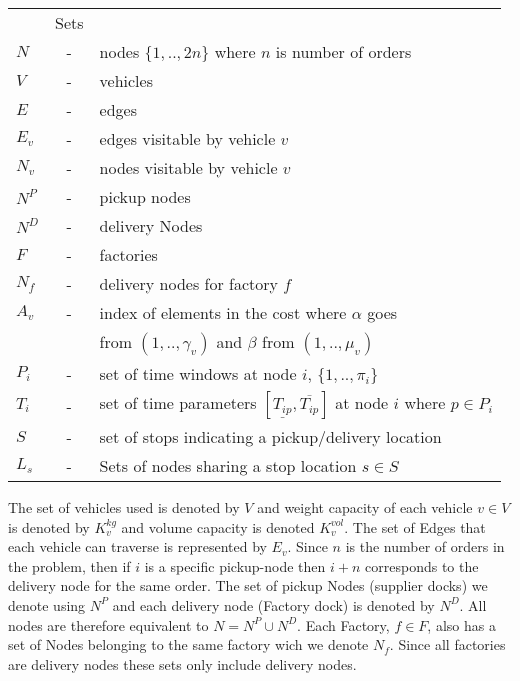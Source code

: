 \documentclass[a4paper,10pt]{article}
\begin{document}
\begin{tabular}{l c l }
              &Sets 					        	\\ 
    $N      $ &-& nodes $\{1,..,2n\}$ where $n$ is number of orders     \\
    $V      $ &-& vehicles  					        \\
    $E      $ &-& edges 					        \\
    $E_v    $ &-& edges visitable by vehicle $v$ 		        \\
    $N_v    $ &-& nodes visitable by vehicle $v$  		        \\
    $N^P    $ &-& pickup nodes 					        \\
    $N^D    $ &-& delivery Nodes 				        \\
    $F      $ &-& factories 					        \\
    $N_f    $ &-& delivery nodes for factory $f$ 		        \\
    $A_v    $ &-& index of elements in the cost where $\alpha$ goes     \\
              & & from $(1,..,\gamma_v)$ and $\beta$ from $(1,..,\mu_v)$\\
    $P_i    $ &-& set of time windows at node $i$, $\{1,..,\pi_i \}$	\\
    $T_{i}  $ &-& set of time parameters $[ \underline{T_{ip}},  
		  \overline{T_{ip}} ]$ at node $i$ where $p \in P_i$	\\
    $S      $ &-& set of stops indicating a pickup/delivery location    \\
    $L_s    $ &-& Sets of nodes sharing a stop location 
                  $s \in S$ 	                                        \\
\end{tabular}
\linebreak
\linebreak
\par
The set of vehicles used is denoted by $V$ and weight capacity of each vehicle $v \in V$ is denoted by $K_v^{kg}$ and volume capacity is denoted $K_v^{vol}$.
The set of Edges that each vehicle can traverse is represented by $E_v$. 
Since $n$ is the number of orders in the problem, then if $i$ is a specific pickup-node then $i+n$ corresponds to the delivery node for the same order.
The set of pickup Nodes (supplier docks) we denote using $N^P$ and each delivery node (Factory dock) is denoted by $N^D$. 
All nodes are therefore equivalent to $N = N^P \cup N^D$. 
Each Factory, $f \in F$, also has a set of Nodes belonging to the same factory wich we denote $N_f$. Since all factories are delivery nodes these sets only include delivery nodes.
\end{document}
